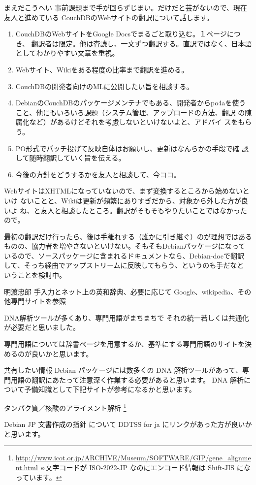 \begin{prework}{まえだこうへい}
事前課題まで手が回らずじまい。だけだと芸がないので、現在友人と進めている
 CouchDBのWebサイトの翻訳について話します。
\begin{enumerate}
 \item CouchDBのWebサイトをGoogle Docsでまるごと取り込む。１ページにつき、
       翻訳者は限定。他は査読し、一文ずつ翻訳する。直訳ではなく、日本語
       としてわかりやすい文章を重視。
 \item Webサイト、Wikiをある程度の比率まで翻訳を進める。
 \item CouchDBの開発者向けのMLに公開したい旨を相談する。
 \item DebianのCouchDBのパッケージメンテナでもある、開発者からpo4aを使う
       こと、他にもいろいろ課題（システム管理、アップロードの方法、翻訳
       の陳腐化など）があるけどそれを考慮しないといけないよと、アドバイ
       スをもらう。
 \item PO形式でパッチ投げて反映自体はお願いし、更新はなんらかの手段で確
       認して随時翻訳していく旨を伝える。
 \item 今後の方針をどうするかを友人と相談して、今ココ。
\end{enumerate}

WebサイトはXHTMLになっていないので、まず変換するところから始めないといけ
 ないことと、Wikiは更新が頻繁にありすぎだから、対象から外した方が良いよ
 ね、と友人と相談したところ。翻訳がそもそもやりたいことではなかったので。

最初の翻訳だけ行ったら、後は手離れする（誰かに引き継ぐ）のが理想ではある
 ものの、協力者を増やさないといけない。そもそもDebianパッケージになって
 いるので、ソースパッケージに含まれるドキュメントなら、Debian-docで翻訳
 して、そっち経由でアップストリームに反映してもらう、というのも手だなと
 いうことを検討中。
\end{prework}


\begin{prework}{明渡忠郎}
手入力とネット上の英和辞典、必要に応じて Google、wikipedia、その他専門サイトを参照
 
DNA解析ツールが多くあり、専門用語がまちまちで
それの統一若しくは共通化が必要だと思いました。

専門用語については辞書ページを用意するか、基準にする専門用語のサイトを決めるのが良いかと思います。

共有したい情報
Debian パッケージには数多くの DNA 解析ツールがあって、専門用語の翻訳にあたって注意深く作業する必要があると思います。
DNA 解析について予備知識として下記サイトが参考になるかと思います。

タンパク質／核酸のアライメント解析 
\footnote{\url{http://www.icot.or.jp/ARCHIVE/Museum/SOFTWARE/GIP/gene_alignment.html}
 ※文字コードが ISO-2022-JP なのにエンコード情報は Shift-JIS になっています。}

Debian JP 文書作成の指針 について DDTSS for ja にリンクがあった方が良いかと思います。

\end{prework}

